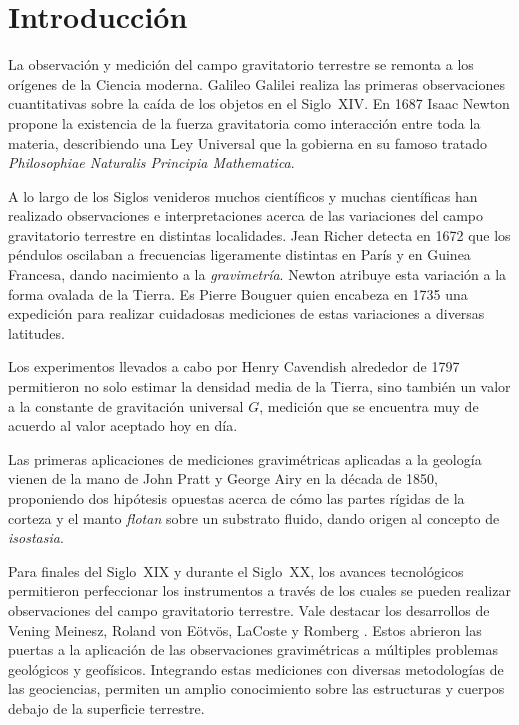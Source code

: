 \chapter{Introducción}

La observación y medición del campo gravitatorio terrestre se remonta a los
orígenes de la Ciencia moderna. Galileo Galilei realiza las primeras
observaciones cuantitativas sobre la caída de los objetos en el Siglo~XIV. En
1687 Isaac Newton propone la existencia de la fuerza gravitatoria como
interacción entre toda la materia, describiendo una Ley Universal que la
gobierna en su famoso tratado \emph{Philosophiae Naturalis Principia
Mathematica}.

A lo largo de los Siglos venideros muchos científicos y muchas científicas
han realizado observaciones e interpretaciones acerca de las variaciones del
campo gravitatorio terrestre en distintas localidades. Jean Richer detecta en
1672 que los péndulos oscilaban a frecuencias ligeramente distintas en París
y en Guinea Francesa, dando nacimiento a la \emph{gravimetría}. Newton atribuye
esta variación a la forma ovalada de la Tierra. Es Pierre Bouguer quien
encabeza en 1735 una expedición para realizar cuidadosas mediciones de estas
variaciones a diversas latitudes.

Los experimentos llevados a cabo por Henry Cavendish alrededor de 1797
permitieron no solo estimar la densidad media de la Tierra, sino también un
valor a la constante de gravitación universal $G$, medición que se encuentra
muy de acuerdo al valor aceptado hoy en día.

Las primeras aplicaciones de mediciones gravimétricas aplicadas a la geología
vienen de la mano de John Pratt y George Airy en la década de 1850, proponiendo
dos hipótesis opuestas acerca de cómo las partes rígidas de la corteza y el
manto \emph{flotan} sobre un substrato fluido, dando origen al concepto de
\emph{isostasia}.

Para finales del Siglo~XIX y durante el Siglo~XX, los avances tecnológicos
permitieron perfeccionar los instrumentos a través de los cuales se pueden
realizar observaciones del campo gravitatorio terrestre. Vale destacar los
desarrollos de Vening Meinesz, Roland von Eötvös, LaCoste y Romberg
\citep{blakely1995}.
Estos abrieron las puertas a la aplicación de las observaciones gravimétricas
a múltiples problemas geológicos y geofísicos. Integrando estas mediciones con
diversas metodologías de las geociencias, permiten un amplio conocimiento sobre
las estructuras y cuerpos debajo de la superficie terrestre.

